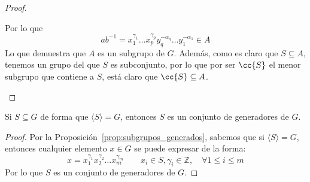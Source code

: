 \begin{prop}
\begin{proof}
\begin{itemize}
\begin{description}
\begin{equation*}
{}                        \end{equation*}
                        Por lo que
                        \begin{equation*}
                            ab^{-1} = x_1^{\gamma_1} \ldots x_p^{\gamma_p} y_q^{-\alpha_q} \ldots y_1^{-\alpha_1} \in A
                        \end{equation*}
                        Lo que demuestra que $A$ es un subgrupo de $G$. Además, como es claro que $S\subseteq A$, tenemos un grupo del que $S$ es subconjunto, por lo que por ser $\cc{S}$ el menor subgrupo que contiene a $S$, está claro que $\cc{S}\subseteq A$.\qedhere
                \end{description}
        \end{itemize}
    \end{proof}
\end{prop}

\begin{coro}
    Si $S\subseteq G$ de forma que $\langle S \rangle =G$, entonces $S$ es un conjunto de generadores de $G$.
    \begin{proof}
        Por la Proposición~\ref{prop:subgrupos_generados}, sabemos que si $\langle S \rangle = G$, entonces cualquier elemento $x\in G$ se puede expresar de la forma:
        \begin{equation*}
            x = x_1^{\gamma_1}x_2^{\gamma_2}\ldots x_m^{\gamma_m} \qquad x_i \in S, \gamma_i \in \mathbb{Z}, \quad \forall 1\leq i \leq m
        \end{equation*}
        Por lo que $S$ es un conjunto de generadores de $G$.
    \end{proof}
\end{coro}


